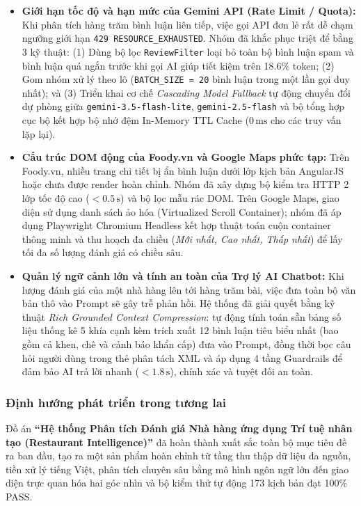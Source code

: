 \documentclass[12pt, a4paper]{article}
\begin{document}
\begin{itemize}[leftmargin=1.2cm]
    \item \textbf{Giới hạn tốc độ và hạn mức của Gemini API (Rate Limit / Quota):} 
    Khi phân tích hàng trăm bình luận liên tiếp, việc gọi API đơn lẻ rất dễ chạm ngưỡng giới hạn \texttt{429 RESOURCE\_EXHAUSTED}. Nhóm đã khắc phục triệt để bằng 3 kỹ thuật: 
    (1) Dùng bộ lọc \texttt{ReviewFilter} loại bỏ toàn bộ bình luận spam và bình luận quá ngắn trước khi gọi AI giúp tiết kiệm trên 18.6\% token; 
    (2) Gom nhóm xử lý theo lô (\texttt{BATCH\_SIZE = 20} bình luận trong một lần gọi duy nhất); và 
    (3) Triển khai cơ chế \textit{Cascading Model Fallback} tự động chuyển đổi dự phòng giữa \texttt{gemini-3.5-flash-lite}, \texttt{gemini-2.5-flash} và bộ tổng hợp cục bộ kết hợp bộ nhớ đệm In-Memory TTL Cache ($0\,\mathrm{ms}$ cho các truy vấn lặp lại).
    
    \item \textbf{Cấu trúc DOM động của Foody.vn và Google Maps phức tạp:} 
    Trên Foody.vn, nhiều trang chi tiết bị ẩn bình luận dưới lớp kịch bản AngularJS hoặc chưa được render hoàn chỉnh. Nhóm đã xây dựng bộ kiểm tra HTTP 2 lớp tốc độ cao ($<0.5\,\mathrm{s}$) và bộ lọc mẫu rác DOM. Trên Google Maps, giao diện sử dụng danh sách ảo hóa (Virtualized Scroll Container); nhóm đã áp dụng Playwright Chromium Headless kết hợp thuật toán cuộn container thông minh và thu hoạch đa chiều (\textit{Mới nhất, Cao nhất, Thấp nhất}) để lấy tối đa số lượng đánh giá có chiều sâu.
    
    \item \textbf{Quản lý ngữ cảnh lớn và tính an toàn của Trợ lý AI Chatbot:} 
    Khi lượng đánh giá của một nhà hàng lên tới hàng trăm bài, việc đưa toàn bộ văn bản thô vào Prompt sẽ gây trễ phản hồi. Hệ thống đã giải quyết bằng kỹ thuật \textit{Rich Grounded Context Compression}: tự động tính toán sẵn bảng số liệu thống kê 5 khía cạnh kèm trích xuất 12 bình luận tiêu biểu nhất (bao gồm cả khen, chê và cảnh báo khẩn cấp) đưa vào Prompt, đồng thời bọc câu hỏi người dùng trong thẻ phân tách XML và áp dụng 4 tầng Guardrails để đảm bảo AI trả lời nhanh ($< 1.8\,\mathrm{s}$), chính xác và tuyệt đối an toàn.
\end{itemize}

\subsubsection{Định hướng phát triển trong tương lai}
Đồ án \textbf{``Hệ thống Phân tích Đánh giá Nhà hàng ứng dụng Trí tuệ nhân tạo (Restaurant Intelligence)''} đã hoàn thành xuất sắc toàn bộ mục tiêu đề ra ban đầu, tạo ra một sản phẩm hoàn chỉnh từ tầng thu thập dữ liệu đa nguồn, tiền xử lý tiếng Việt, phân tích chuyên sâu bằng mô hình ngôn ngữ lớn đến giao diện trực quan hóa hai góc nhìn và bộ kiểm thử tự động 173 kịch bản đạt 100\% PASS.
\end{document}
